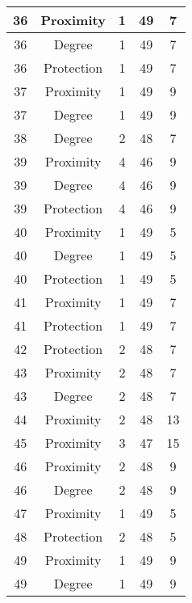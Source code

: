 \documentclass[results.tex]{subfiles}
\begin{document}
\begin{center}
\begin{tabular}{| c || c | c | c | c |}
    \hline
    36 & Proximity & 1 & 49 & 7 \\ 
    \hline
    36 & Degree & 1 & 49 & 7 \\ 
    \hline
    36 & Protection & 1 & 49 & 7 \\ 
    \hline
    37 & Proximity & 1 & 49 & 9 \\ 
    \hline
    37 & Degree & 1 & 49 & 9 \\ 
    \hline
    38 & Degree & 2 & 48 & 7 \\ 
    \hline
    39 & Proximity & 4 & 46 & 9 \\ 
    \hline
    39 & Degree & 4 & 46 & 9 \\ 
    \hline
    39 & Protection & 4 & 46 & 9 \\ 
    \hline
    40 & Proximity & 1 & 49 & 5 \\ 
    \hline
    40 & Degree & 1 & 49 & 5 \\ 
    \hline
    40 & Protection & 1 & 49 & 5 \\ 
    \hline
    41 & Proximity & 1 & 49 & 7 \\ 
    \hline
    41 & Protection & 1 & 49 & 7 \\ 
    \hline
    42 & Protection & 2 & 48 & 7 \\ 
    \hline
    43 & Proximity & 2 & 48 & 7 \\ 
    \hline
    43 & Degree & 2 & 48 & 7 \\ 
    \hline
    44 & Proximity & 2 & 48 & 13 \\ 
    \hline
    45 & Proximity & 3 & 47 & 15 \\ 
    \hline
    46 & Proximity & 2 & 48 & 9 \\ 
    \hline
    46 & Degree & 2 & 48 & 9 \\ 
    \hline
    47 & Proximity & 1 & 49 & 5 \\ 
    \hline
    48 & Protection & 2 & 48 & 5 \\ 
    \hline
    49 & Proximity & 1 & 49 & 9 \\ 
    \hline
    49 & Degree & 1 & 49 & 9 \\ 
    \hline   \end{tabular}
\end{center}
\end{document}
